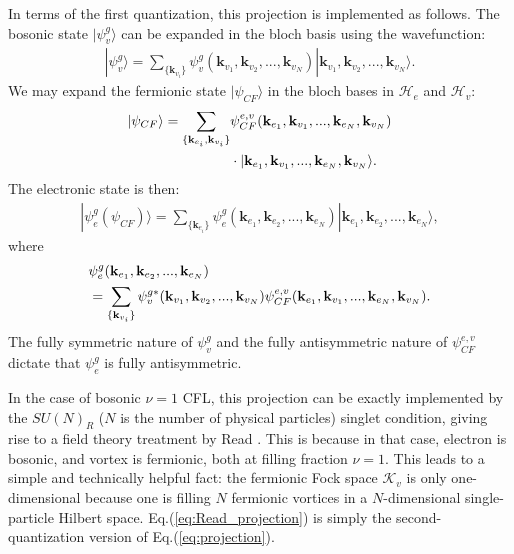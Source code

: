 In terms of the first quantization, this projection is implemented as follows. The bosonic state $|\psi_v^g\rangle$ can be expanded in the bloch basis using the wavefunction:
\begin{align}
    |\psi_v^g\rangle=\sum_{\{\mathbf k_{v_i}\}} \psi_v^g(\mathbf k_{v_1},\mathbf k_{v_2},...,\mathbf k_{v_N}) |\mathbf k_{v_1},\mathbf k_{v_2},...,\mathbf k_{v_N}\rangle.
\end{align}
We may expand the fermionic state $|\psi_{CF}\rangle$ in the bloch bases in $\mathcal H_e$ and $\mathcal H_v$:
\begin{align}
    |\psi_{CF}\rangle=\sum_{\{\mathbf k_{e_i},\mathbf k_{v_i}\}} & \psi^{e,v}_{CF}(\mathbf k_{e_1},\mathbf k_{v_1},...,\mathbf k_{e_N},\mathbf k_{v_N}) \notag \\
                                                                 & \cdot|\mathbf k_{e_1},\mathbf k_{v_1},...,\mathbf k_{e_N},\mathbf k_{v_N}\rangle.
\end{align}
The electronic state is then:
\begin{align}
    |\psi^g_e(\psi_{CF})\rangle=\sum_{\{\mathbf k_{e_i}\}} \psi_e^g(\mathbf k_{e_1},\mathbf k_{e_2},...,\mathbf k_{e_N}) |\mathbf k_{e_1},\mathbf k_{e_2},...,\mathbf k_{e_N}\rangle,
\end{align}
where
\begin{align}
     & \psi_e^g(\mathbf k_{e_1},\mathbf k_{e_2},...,\mathbf k_{e_N})\notag                                                                                                                                   \\
     & =\sum_{\{\mathbf k_{v_i}\}}\psi_v^{g*}(\mathbf k_{v_1},\mathbf k_{v_2},...,\mathbf k_{v_N})\psi^{e,v}_{CF}(\mathbf k_{e_1},\mathbf k_{v_1},...,\mathbf k_{e_N},\mathbf k_{v_N}).\label{eq:projection}
\end{align}
The fully symmetric nature of $\psi_v^g$ and the fully antisymmetric nature of $\psi^{e,v}_{CF}$ dictate that $\psi_e^g$ is fully antisymmetric.

In the case of bosonic $\nu=1$ CFL, this projection can be exactly implemented by the $SU(N)_R$ ($N$ is the number of physical particles) singlet condition, giving rise to a field theory treatment by Read \cite{read1998lowest}. This is because in that case, electron is bosonic, and vortex is fermionic, both at filling fraction $\nu=1$. This leads to a simple and technically helpful fact: the fermionic Fock space $\mathcal K_v$ is only one-dimensional because one is filling $N$ fermionic vortices in a $N$-dimensional single-particle Hilbert space. Eq.(\ref{eq:Read_projection}) is simply the second-quantization version of Eq.(\ref{eq:projection}).


